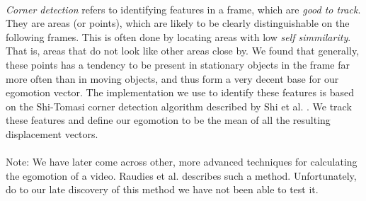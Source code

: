 \\
\textit{Corner detection} refers to identifying features in a frame, which are \textit{good to track}. They are areas (or points), which are likely to be clearly distinguishable on the following frames. This is often done by locating areas with low \textit{self simmilarity}. That is, areas that do not look like other areas close by. We found that generally, these points has a tendency to be present in stationary objects in the frame far more often than in moving objects, and thus form a very decent base for our egomotion vector. The implementation we use to identify these features is based on the Shi-Tomasi corner detection algorithm described by Shi et al. \cite{Shi_1994_3266}. We track these features and define our egomotion to be the mean of all the resulting displacement vectors.\\\\
%
Note: We have later come across other, more advanced techniques for calculating the egomotion of a video. Raudies et al. \cite{Raudies:2009:ELM:1612122.1612125} describes such a method. Unfortunately, do to our late discovery of this method we have not been able to test it.
%
